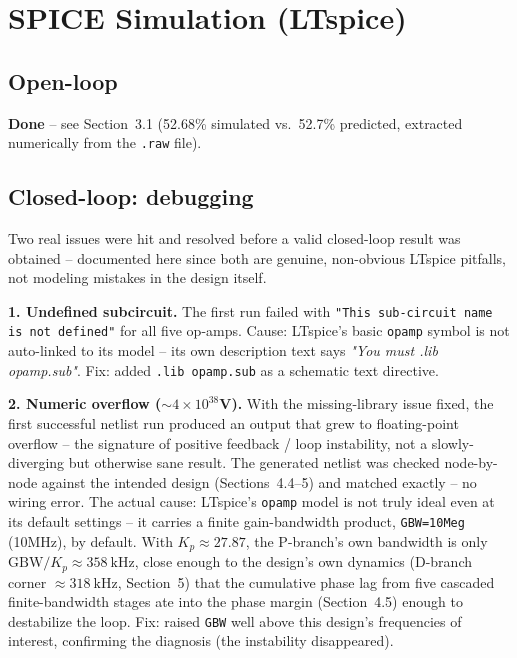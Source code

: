 \documentclass[11pt,letterpaper]{article}
\begin{document}
\section{SPICE Simulation (LTspice)}

\subsection{Open-loop}

\textbf{Done} -- see Section~3.1 (52.68\% simulated vs.\ 52.7\% predicted, extracted numerically from
the \texttt{.raw} file).

\subsection{Closed-loop: debugging}

Two real issues were hit and resolved before a valid closed-loop result was obtained -- documented
here since both are genuine, non-obvious LTspice pitfalls, not modeling mistakes in the design itself.

\textbf{1. Undefined subcircuit.} The first run failed with \texttt{"This sub-circuit name is not
defined"} for all five op-amps. Cause: LTspice's basic \texttt{opamp} symbol is not auto-linked to its
model -- its own description text says \textit{"You must .lib opamp.sub"}. Fix: added
\texttt{.lib opamp.sub} as a schematic text directive.

\textbf{2. Numeric overflow ($\sim 4\times10^{38}$V).} With the missing-library issue fixed, the first
successful netlist run produced an output that grew to floating-point overflow -- the signature of
positive feedback / loop instability, not a slowly-diverging but otherwise sane result. The generated
netlist was checked node-by-node against the intended design (Sections~4.4--5) and matched exactly --
no wiring error. The actual cause: LTspice's \texttt{opamp} model is not truly ideal even at its default
settings -- it carries a finite gain-bandwidth product, \texttt{GBW=10Meg} (10MHz), by default. With
$K_p\approx27.87$, the P-branch's own bandwidth is only $\text{GBW}/K_p\approx\SI{358}{\kilo\hertz}$,
close enough to the design's own dynamics (D-branch corner $\approx\SI{318}{\kilo\hertz}$, Section~5)
that the cumulative phase lag from five cascaded finite-bandwidth stages ate into the phase margin
(Section~4.5) enough to destabilize the loop. Fix: raised \texttt{GBW} well above this design's
frequencies of interest, confirming the diagnosis (the instability disappeared).
\end{document}
